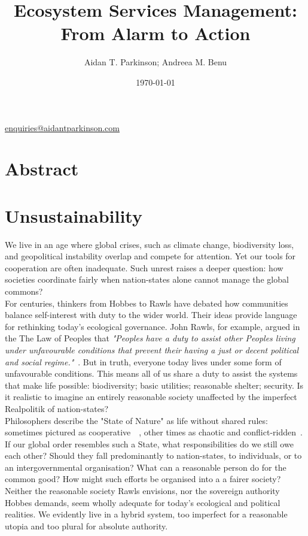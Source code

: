 \documentclass[11pt, oneside]{article}   	%
\title{Ecosystem Services Management: From Alarm to Action}
\author{Aidan T. Parkinson; Andreea M. Benu}
\date{\today}							%
\begin{document}
\maketitle
\begin{center}
\href{mailto:enquiries@aidantparkinson.com}{enquiries@aidantparkinson.com}
\end{center}

\section{Abstract}


\section{Unsustainability}

We live in an age where global crises, such as climate change, biodiversity loss, and geopolitical instability overlap and compete for attention.
Yet our tools for cooperation are often inadequate.
Such unrest raises a deeper question: how societies coordinate fairly when nation-states alone cannot manage the global commons?\\

For centuries, thinkers from Hobbes to Rawls have debated how communities balance self-interest with duty to the wider world.
Their ideas provide language for rethinking today's ecological governance.
John Rawls, for example, argued in the The Law of Peoples that \emph{"Peoples have a duty to assist other Peoples living under unfavourable conditions that prevent their having a just or decent political and social regime."}~\cite{jr2}.
But in truth, everyone today lives under some form of unfavourable conditions.
This means all of us share a duty to assist the systems that make life possible: biodiversity; basic utilities; reasonable shelter; security.
Is it realistic to imagine an entirely reasonable society unaffected by the imperfect Realpolitik of nation-states?\\

Philosophers describe the "State of Nature" as life without shared rules: sometimes pictured as cooperative~\cite{jl1}~\cite{rn1}, other times as chaotic and conflict-ridden~\cite{th1}.
If our global order resembles such a State, what responsibilities do we still owe each other?
Should they fall predominantly to nation-states, to individuals, or to an intergovernmental organisation?
What can a reasonable person do for the common good?
How might such efforts be organised into a a fairer society?
Neither the reasonable society Rawls envisions, nor the sovereign authority Hobbes demands, seem wholly adequate for today's ecological and political realities.
We evidently live in a hybrid system, too imperfect for a reasonable utopia and too plural for absolute authority.\\
\end{document}
